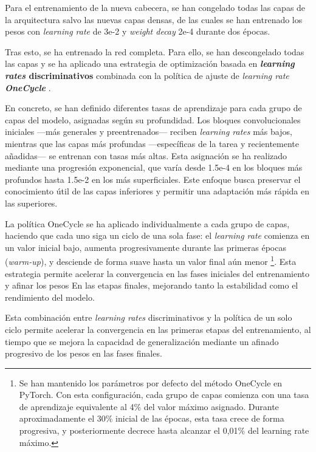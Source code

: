 Para el entrenamiento de la nueva cabecera, se han congelado todas las capas de la arquitectura salvo las nuevas capas densas, de las cuales se han entrenado los pesos con \textit{learning rate} de 3e-2 y \textit{weight decay} 2e-4 durante dos épocas.

Tras esto, se ha entrenado la red completa. Para ello, se han descongelado todas las capas y se ha aplicado una estrategia de optimización basada en \textbf{\textit{learning rates} discriminativos} combinada con la política de ajuste de \textit{learning rate \textbf{OneCycle}} \cite{smith2018}.

En concreto, se han definido diferentes tasas de aprendizaje para cada grupo de capas del modelo, asignadas según su profundidad. Los bloques convolucionales iniciales ---más generales y preentrenados--- reciben \textit{learning rates} más bajos, mientras que las capas más profundas ---específicas de la tarea y recientemente añadidas--- se entrenan con tasas más altas. Esta asignación se ha realizado mediante una progresión exponencial, que varía desde 1.5e-4 en los bloques más profundos hasta 1.5e-2 en los más superficiales. Este enfoque busca preservar el conocimiento útil de las capas inferiores y permitir una adaptación más rápida en las superiores.

La política OneCycle se ha aplicado individualmente a cada grupo de capas, haciendo que cada uno siga un ciclo de una sola fase: el \textit{learning rate} comienza en un valor inicial bajo, aumenta progresivamente durante las primeras épocas (\textit{warm-up}), y desciende de forma suave hasta un valor final aún menor%
\footnote{
    Se han mantenido los parámetros por defecto del método OneCycle en PyTorch. Con esta configuración, cada grupo de capas comienza con una tasa de aprendizaje equivalente al 4\% del valor máximo asignado. Durante aproximadamente el 30\% inicial de las épocas, esta tasa crece de forma progresiva, y posteriormente decrece hasta alcanzar el 0,01\% del learning rate máximo.
}. 
Esta estrategia permite acelerar la convergencia en las fases iniciales del entrenamiento y afinar los pesos En las etapas finales, mejorando tanto la estabilidad como el rendimiento del modelo.

Esta combinación entre \textit{learning rates} discriminativos y la política de un solo ciclo permite acelerar la convergencia en las primeras etapas del entrenamiento, al tiempo que se mejora la capacidad de generalización mediante un afinado progresivo de los pesos en las fases finales.


